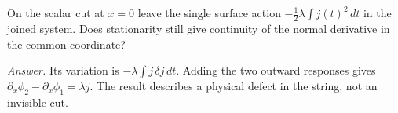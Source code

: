 \begin{exercise}
On the scalar cut at $x=0$ leave the single surface action
$-\tfrac12\lambda\int j(t)^2\,dt$ in the joined system. Does stationarity
still give continuity of the normal derivative in the common coordinate?
\end{exercise}
\noindent\emph{Answer.} Its variation is $-\lambda\int j\,\delta j\,dt$.
Adding the two outward responses gives
$\partial_x\phi_2-\partial_x\phi_1=\lambda j$. The result describes a
physical defect in the string, not an invisible cut.
